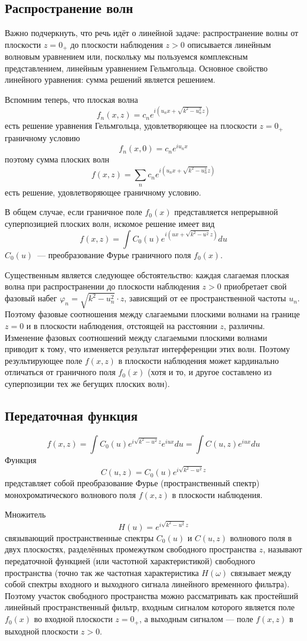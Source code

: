 \subsection{Распространение волн}
Важно подчеркнуть, что речь идёт о линейной задаче: распространение волны от плоскости $z=0_+$  до плоскости наблюдения $z > 0$ описывается линейным волновым уравнением  или, поскольку мы пользуемся комплексным представлением, линейным уравнением Гельмгольца. Основное свойство линейного уравнения: сумма решений является решением.

Вспомним теперь, что плоская волна
\[
    f_n(x, z) = c_n e^{i(u_nx + \sqrt{k^2-u_n^2}z)}
\]
есть решение уравнения Гельмгольца, удовлетворяющее на плоскости $z=0_+$ граничному условию
\[
    f_n(x, 0) = c_n e^{iu_nx}
\]
поэтому сумма плоских волн
\[
    f(x,z) = \sum_n c_n e^{i(u_nx + \sqrt{k^2-u_n^2}z)}
\]
есть решение, удовлетворяющее граничному условию.

В общем случае, если граничное поле $f_0(x)$ представляется непрерывной суперпозицией плоских волн, искомое решение имеет вид
\[
    f(x,z) = \int C_0(u) e^{i(ux+\sqrt{k^2-u^2}z)} du
\]
$C_0(u)$~--- преобразование Фурье граничного поля $f_0(x)$.

Существенным является следующее обстоятельство: каждая слагаемая плоская волна при распространении до плоскости наблюдения $z > 0$ приобретает свой фазовый набег $\varphi_n = \sqrt{k^2 - u_n^2}\cdot z$, зависящий от ее пространственной частоты $u_n$. Поэтому фазовые соотношения между слагаемыми плоскими волнами на границе $z=0$ и в плоскости наблюдения, отстоящей на расстоянии $z$,  различны. Изменение фазовых соотношений между слагаемыми плоскими волнами приводит к тому, что изменяется результат интерференции этих волн. Поэтому результирующее поле $f(x,z)$ в плоскости наблюдения может кардинально отличаться от граничного поля $f_0(x)$ (хотя и то, и другое составлено из суперпозиции тех же бегущих плоских волн).

\subsection{Передаточная функция}
\[
f(x,z) = \int C_0(u) e^{i\sqrt{k^2-u^2}z}e^{iux}du = \int C(u,z)e^{iux}du
\]
Функция
\[
C(u,z) = C_0(u) e^{i\sqrt{k^2-u^2}z}
\]
представляет собой преобразование Фурье (пространственный спектр) монохроматического волнового поля $f(x,z)$ в плоскости наблюдения.

Множитель
\[
H(u) = e^{i\sqrt{k^2-u^2}z}
\]
связывающий пространственные спектры $C_0(u)$ и $C(u, z)$ волнового поля в двух плоскостях, разделённых промежутком свободного пространства $z$, называют передаточной функцией (или частотной характеристикой) свободного пространства (точно так же частотная характеристика $H(\omega)$  связывает между собой спектры входного и выходного сигнала линейного временного фильтра). Поэтому участок свободного пространства можно рассматривать как простейший линейный пространственный фильтр, входным сигналом которого является поле $f_0(x)$ во входной плоскости $z=0_+$, а выходным сигналом --- поле $f(x,z)$ в выходной плоскости $z>0$.

